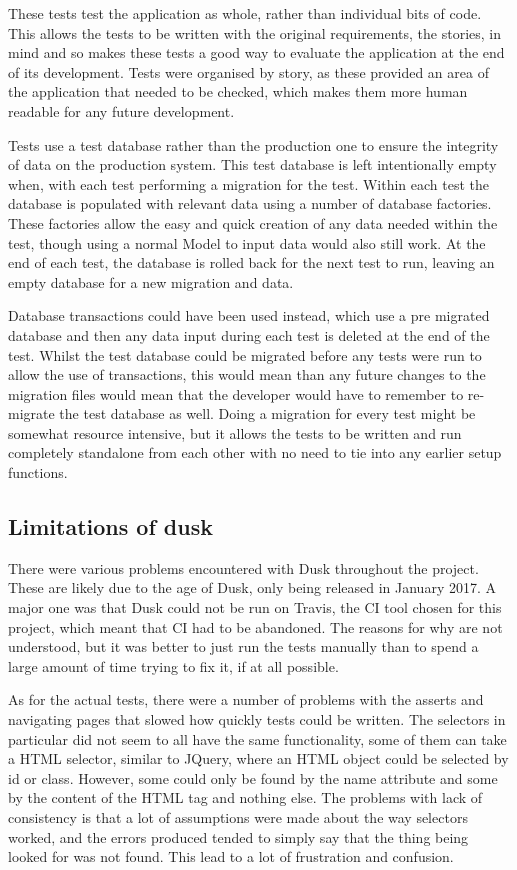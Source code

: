 These tests test the application as whole, rather than individual bits of code. This allows the tests to be written with the original requirements, the stories, in mind and so makes these tests a good way to evaluate the application at the end of its development. Tests were organised by story, as these provided an area of the application that needed to be checked, which makes them more human readable for any future development.

Tests use a test database rather than the production one to ensure the integrity of data on the production system. This test database is left intentionally empty when, with each test performing a migration for the test. Within each test the database is populated with relevant data using a number of database factories. These factories allow the easy and quick creation of any data needed within the test, though using a normal Model to input data would also still work. At the end of each test, the database is rolled back for the next test to run, leaving an empty database for a new migration and data.

Database transactions could have been used instead, which use a pre migrated database and then any data input during each test is deleted at the end of the test. Whilst the test database could be migrated before any tests were run to allow the use of transactions, this would mean than any future changes to the migration files would mean that the developer would have to remember to re-migrate the test database as well. Doing a migration for every test might be somewhat resource intensive, but it allows the tests to be written and run completely standalone from each other with no need to tie into any earlier setup functions. 

\subsection{Limitations of dusk}
There were various problems encountered with Dusk throughout the project. These are likely due to the age of Dusk, only being released in January 2017. A major one was that Dusk could not be run on Travis, the CI tool chosen for this project, which meant that CI had to be abandoned. The reasons for why are not understood, but it was better to just run the tests manually than to spend a large amount of time trying to fix it, if at all possible.

As for the actual tests, there were a number of problems with the asserts and navigating pages that slowed how quickly tests could be written. The selectors in particular did not seem to all have the same functionality, some of them can take a HTML selector, similar to JQuery, where an HTML object could be selected by id or class. However, some could only be found by the name attribute and some by the content of the HTML tag and nothing else. The problems with lack of consistency is that a lot of assumptions were made about the way selectors worked, and the errors produced tended to simply say that the thing being looked for was not found. This lead to a lot of frustration and confusion. 


